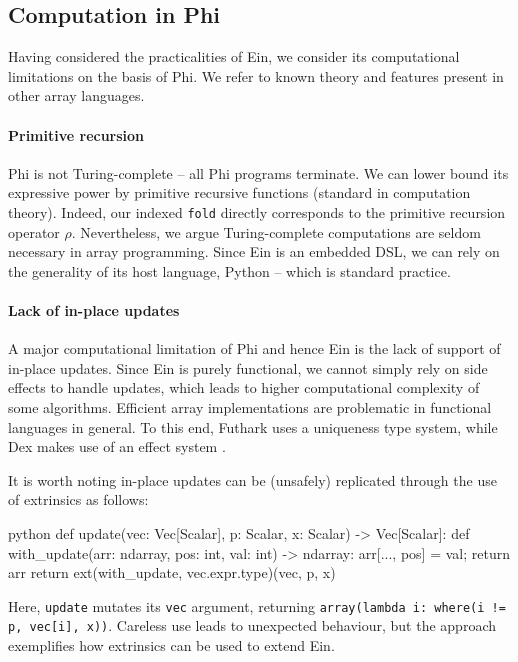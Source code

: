 \subsection{Computation in Phi}

Having considered the practicalities of Ein, we consider its computational limitations on the basis of Phi. We refer to known theory and features present in other array languages.

\paragraph{Primitive recursion} 
Phi is not Turing-complete -- all Phi programs terminate. 
We can lower bound its expressive power by primitive recursive functions (standard in computation theory). 
Indeed, our indexed \texttt{fold} directly corresponds to the primitive recursion operator $\rho$. 
Nevertheless, we argue Turing-complete computations are seldom necessary in array programming. 
Since Ein is an embedded DSL, we can rely on the generality of its host language, Python -- which is standard practice. 

\paragraph{Lack of in-place updates} A major computational limitation of Phi and hence Ein is the lack of support of in-place updates. 
Since Ein is purely functional, we cannot simply rely on side effects to handle updates, which leads to higher computational complexity of some algorithms. 
Efficient array implementations are problematic in functional languages in general. 
To this end, Futhark uses a uniqueness type system, while Dex makes use of an effect system \cite{henriksen2017futhark, paszke2021getting}. 

\needspace{1em}
It is worth noting in-place updates can be (unsafely) replicated through the use of extrinsics as follows: 
\begin{center}    
\begin{cminted}{python}
def update(vec: Vec[Scalar], p: Scalar, x: Scalar) -> Vec[Scalar]:
    def with_update(arr: ndarray, pos: int, val: int) -> ndarray:
        arr[..., pos] = val; return arr
    return ext(with_update, vec.expr.type)(vec, p, x)    
\end{cminted}
\end{center}
Here, \texttt{update} mutates its \texttt{vec} argument, returning \texttt{array(lambda i: where(i != p, vec[i], x))}. Careless use leads to unexpected behaviour, but the approach exemplifies how extrinsics can be used to extend Ein.


